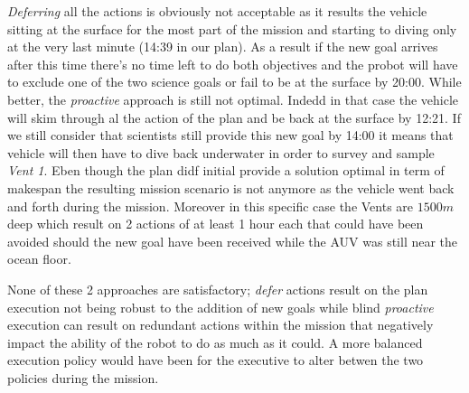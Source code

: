 {\em Deferring} all the actions is obviously not acceptable as 
it results the vehicle sitting at the surface for the most part of the
mission and starting to diving only at the very last minute (14:39 in
our plan). As a result if the new goal arrives after this time there's
no time left to do both objectives and the probot will have to exclude
one of the two science goals or fail to be at the surface by
20:00. While better, the {\em proactive} approach is still not
optimal. Indedd in that case the vehicle will skim through al the
action of the plan and be back at the surface by 12:21. If we still
consider that scientists still provide this new goal by 14:00  it
means that vehicle  will then have to dive back underwater in order to
survey and sample {\em Vent 1}. Eben though the plan didf initial
provide a solution optimal in term of makespan the resulting mission
scenario is not anymore as the vehicle went back and forth during the
mission. Moreover in this specific case the Vents are $1500 m$ deep
which result on 2 actions of at least 1 hour each that could have been
avoided should the new goal have been received while the AUV was still 
near the ocean floor. 

None of these 2 approaches are satisfactory; {\em defer} actions
result on the plan execution not being robust to the addition of new
goals while blind {\em proactive} execution can result on redundant
actions within the mission that negatively impact the ability of the
robot to do as much as it could. A more balanced execution policy
would have been for the executive to alter betwen the two policies
during the mission. 

